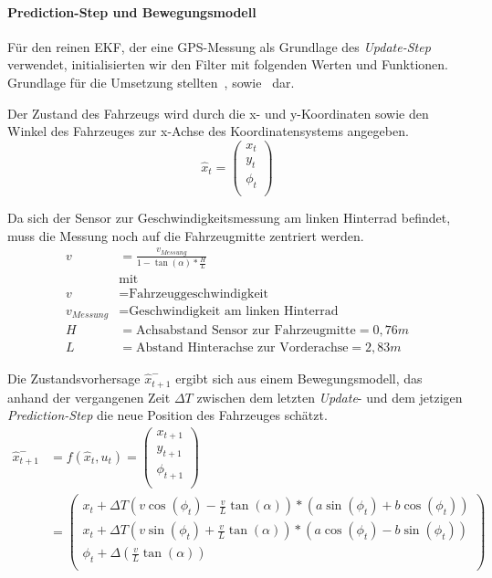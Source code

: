 \documentclass[11pt]{article}
\begin{document}
\paragraph{Prediction-Step und Bewegungsmodell}
Für den reinen EKF, der eine GPS-Messung als Grundlage des \textit{Update-Step} verwendet, initialisierten wir den Filter mit folgenden Werten und Funktionen. Grundlage für die Umsetzung stellten~\cite{ute_SLAM}, sowie~\cite{Freiburg_SLAM_Formeln} dar.

Der Zustand des Fahrzeugs wird durch die x- und y-Koordinaten sowie den Winkel des Fahrzeuges zur x-Achse des Koordinatensystems angegeben.
\begin{equation}\label{EKF-State-Vector}
	\hat{x}_t = \begin{pmatrix}
		x_t \\
		y_t \\
		\phi_t \\
	  \end{pmatrix}
\end{equation}

Da sich der Sensor zur Geschwindigkeitsmessung am linken Hinterrad befindet, muss die Messung noch auf die Fahrzeugmitte zentriert werden.
\begin{equation}\label{Geschwindikeit}
\begin{split}
	v &= \frac{v_{Messung}}{1-\tan(\alpha)*\frac{H}{L}} \\
	&\text{mit } \\
	v &= \text{Fahrzeuggeschwindigkeit} \\
	v_{Messung} &= \text{Geschwindigkeit am linken Hinterrad} \\
	H &= \text{Achsabstand Sensor zur Fahrzeugmitte} = 0,76m \\
	L &= \text{Abstand Hinterachse zur Vorderachse} = 2,83m
\end{split}
\end{equation}

Die Zustandsvorhersage $\hat{x}_{t+1}^-$ ergibt sich aus einem Bewegungsmodell, das anhand der vergangenen Zeit $\Delta T$ zwischen dem letzten \textit{Update}- und dem jetzigen \textit{Prediction-Step} die neue Position des Fahrzeuges schätzt. 
\begin{equation}\label{EKF-Motion-Model}
\begin{split}
	\hat{x}_{t+1}^- &= f(\hat{x}_{t},u_t) = \begin{pmatrix}
		x_{t+1} \\
		y_{t+1} \\
		\phi_{t+1} \\
	  \end{pmatrix} \\
	  &= \begin{pmatrix}
		  x_{t}+\Delta T(v\cos(\phi_t)-\frac{v}{L}\tan(\alpha))*(a\sin(\phi_t)+b\cos(\phi_t)) \\
		  x_{t}+\Delta T(v\sin(\phi_t)+\frac{v}{L}\tan(\alpha))*(a\cos(\phi_t)-b\sin(\phi_t)) \\
		  \phi_t + \Delta(\frac{v}{L}\tan(\alpha)) \\
	  \end{pmatrix}
\end{split}
\end{equation}
\end{document}
